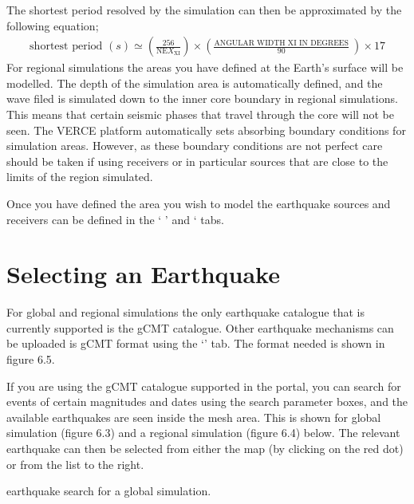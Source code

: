 \documentclass[english]{book}
\begin{document}
The shortest period resolved by the simulation can then be approximated
by the following equation;
\begin{equation*}
\begin{split}
\text{shortest period }\left( s \right) \simeq \left( \frac{256}{\text{NE}X_{\text{XI}}} \right) \times \left( \frac{\text{ANGULAR WIDTH XI IN DEGREES}}{90}\  \right) \times 17
\end{split}
\end{equation*}
For regional simulations the areas you have defined at the Earth’s
surface will be modelled. The depth of the simulation area is
automatically defined, and the wave filed is simulated down to the inner
core boundary in regional simulations. This means that certain seismic
phases that travel through the core will not be seen. The VERCE platform
automatically sets absorbing boundary conditions for simulation areas.
However, as these boundary conditions are not perfect care should be
taken if using receivers or in particular sources that are close to the
limits of the region simulated.

Once you have defined the area you wish to model the earthquake sources
and receivers can be defined in the ‘ ’ and
‘ tabs.


\section{Selecting an Earthquake}
\label{\detokenize{Section6:selecting-an-earthquake}}
For global and regional simulations the only earthquake catalogue that
is currently supported is the gCMT catalogue. Other earthquake
mechanisms can be uploaded is gCMT format using the ‘’ tab.
The format needed is shown in figure 6.5.

If you are using the gCMT catalogue supported in the portal, you can
search for events of certain magnitudes and dates using the search
parameter boxes, and the available earthquakes are seen inside the mesh
area. This is shown for global simulation (figure 6.3) and a regional
simulation (figure 6.4) below. The relevant earthquake can then be
selected from either the map (by clicking on the red dot) or from the
list to the right.


 earthquake search for a global simulation.

\end{document}
